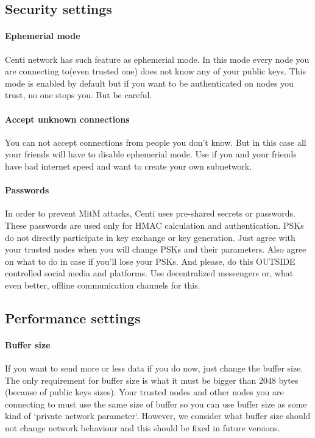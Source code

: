 \documentclass{article}
\begin{document}
	\subsection{Security settings}
		\paragraph{Ephemerial mode}
		Centi network has such feature as ephemerial mode.
		In this mode every node you are connecting to(even trusted one) does not know any of your public keys.
		This mode is enabled by default but if you want to be authenticated on nodes you trust, no one stops you.
		But be careful.

		\paragraph{Accept unknown connections}
		You can not accept connections from people you don't know. But in this case all your friends
		will have to disable ephemerial mode. Use if you and your friends have bad internet speed and
		want to create your own subnetwork.

		\paragraph{Passwords}
		In order to prevent MitM attacks, Centi uses pre-shared secrets or passwords.
		These passwords are used only for HMAC calculation and authentication.
		PSKs do not directly participate in key exchange or key generation.
		Just agree with your trusted nodes when you will change PSKs and their parameters.
		Also agree on what to do in case if you'll lose your PSKs.
		And please, do this OUTSIDE controlled social media and platforms.
		Use decentralized messengers or, what even better, offline communication channels for this.

	\subsection{Performance settings}
		\paragraph{Buffer size}
		If you want to send more or less data if you do now, just change the buffer size.
		The only requirement for buffer size is what it must be bigger than 2048 bytes (because of public keys sizes).
		Your trusted nodes and other nodes you are connecting to must use the same
		size of buffer so you can use buffer size as some kind of `private network parameter`.
		However, we consider what buffer size should not change network behaviour and
		this should be fixed in future versions.
\end{document}
